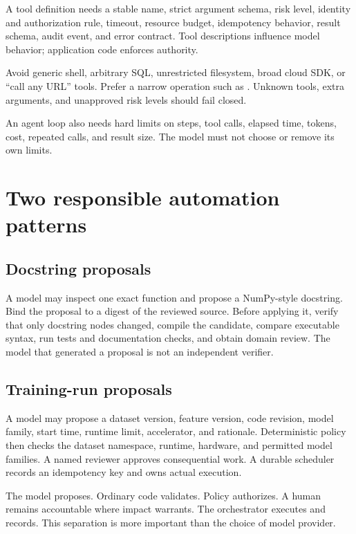 A tool definition needs a stable name, strict argument schema, risk level,
identity and authorization rule, timeout, resource budget, idempotency behavior,
result schema, audit event, and error contract. Tool descriptions influence
model behavior; application code enforces authority.

Avoid generic shell, arbitrary SQL, unrestricted filesystem, broad cloud SDK,
or ``call any URL'' tools. Prefer a narrow operation such as
. Unknown tools, extra arguments, and
unapproved risk levels should fail closed.

An agent loop also needs hard limits on steps, tool calls, elapsed time, tokens,
cost, repeated calls, and result size. The model must not choose or remove its
own limits.

\section{Two responsible automation patterns}

\subsection{Docstring proposals}

A model may inspect one exact function and propose a NumPy-style docstring. Bind
the proposal to a digest of the reviewed source. Before applying it, verify that
only docstring nodes changed, compile the candidate, compare executable syntax,
run tests and documentation checks, and obtain domain review. The model that
generated a proposal is not an independent verifier.

\subsection{Training-run proposals}

A model may propose a dataset version, feature version, code revision, model
family, start time, runtime limit, accelerator, and rationale. Deterministic
policy then checks the dataset namespace, runtime, hardware, and permitted model
families. A named reviewer approves consequential work. A durable scheduler
records an idempotency key and owns actual execution.

\begin{professionalbox}
The model proposes. Ordinary code validates. Policy authorizes. A human remains
accountable where impact warrants. The orchestrator executes and records. This
separation is more important than the choice of model provider.
\end{professionalbox}

